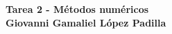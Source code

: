 \begin{center}
	\textbf{
		\textcolor{title}{Tarea 2 - Métodos numéricos\\ Giovanni Gamaliel López Padilla}}
\end{center}
